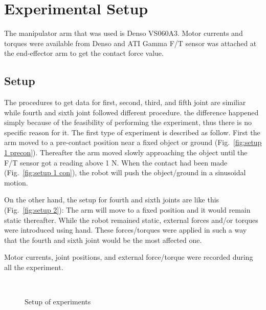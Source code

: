 \documentclass[letterpaper, 10 pt, conference]{ieeeconf}
\newcommand{\fref}[1]{Fig.~\ref{#1}}
\begin{document}
      \section{Experimental Setup}
The manipulator arm that was used is Denso VS060A3. Motor currents and torques were available from Denso and ATI Gamma F/T sensor was attached at the end-effector arm to get the contact force value.  
   
\subsection{Setup}
\label{setup}
The procedures to get data for first, second, third, and fifth joint are similiar while fourth and sixth joint followed different procedure. the difference happened simply because of the feasibility of performing the experiment, thus there is no specific reason for it. The first type of experiment is described as follow. First the arm moved to a pre-contact position near a fixed object or ground (\fref{fig:setup 1 precon}). Thereafter the arm moved slowly approaching the object until the F/T sensor got a reading above 1 N. When the contact had been made (\fref{fig:setup 1 con}), the robot will push the object/ground in a sinusoidal motion.

On the other hand, the setup for fourth and sixth joints are like this (\fref{fig:setup 2}): The arm will move to a fixed position and it would remain static thereafter. While the robot remained static, external forces and/or torques were introduced using hand. These forces/torques were applied in such a way that the fourth and sixth joint would be the most affected one.

Motor currents, joint positions, and external force/torque were recorded during all the experiment.

\begin{figure}[ht]
  \centering
  \,
  \,
  \,
  \caption{Setup of experiments}
\end{figure}
\end{document}

